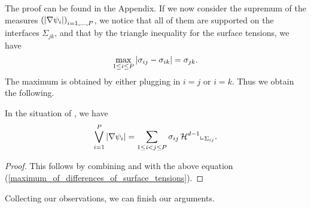 The proof can be found in the Appendix. If we now consider the supremum of the 
measures $ \left( \abs{ \nabla \psi_{ i } } \right)_{ i = 1 , \dotsc, P } $, we 
notice that all of them are supported on the interfaces $ \Sigma_{ j k } $, and 
that by the triangle inequality for the surface tensions, we have 
\begin{equation}
	\label{maximum_of_differences_of_surface_tensions}
	\max_{ 1 \leq i \leq P }
		\abs{ \sigma_{ i j } - \sigma_{ i k } }
	=
	\sigma_{ j k }.
\end{equation}
The maximum is obtained by either plugging in $ i = j $ or $ i = k $. Thus we 
obtain the following.

\begin{proposition}
	\label{supremum_of_abs_nabla_psi_i_is_energy}
	In the situation of , we have
	\begin{equation*}
			\bigvee_{ i = 1 }^{ P }
			\abs{ \nabla \psi_{ i } }
		=
		\sum_{ 1 \leq i < j \leq P }
		 \sigma_{ i j }
		 \operatorname{\mathcal{H}}^{ d - 1 } \llcorner_{ \Sigma_{ i j } } .
	\end{equation*}
\end{proposition}

\begin{proof}
	This follows by combining  and  with the above equation (\ref{maximum_of_differences_of_surface_tensions}).
\end{proof}

Collecting our observations, we can finish our arguments.

